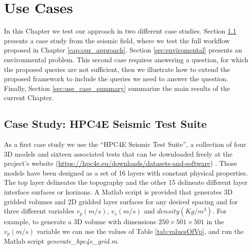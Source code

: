 \chapter[Use Cases]{Use Cases}\label{cap:use_cases}
In this Chapter we test our approach in two different case studies. Section \ref{sec:seismic} presents a case study from the seismic field, where we test the full workflow proposed in Chapter \ref{cap:our_approach}. Section \ref{sec:enviromental} presents an environmental problem. This second case requires answering a question, for which the proposed queries are not sufficient, then we illustrate how to extend the proposed framework to include the queries we need to answer the question. Finally, Section \ref{sec:use_case_summary} summarize the main results of the current Chapter.

\section{Case Study: HPC4E Seismic Test Suite}\label{sec:seismic}
As a first case study we use the “HPC4E Seismic Test Suite”, a collection of four 3D models and sixteen associated tests that can be downloaded freely at the project's website (\url{https://hpc4e.eu/downloads/datasets-and-software}) \cite{deLaPuente2015}. Those models have been designed as a set of 16 layers with constant physical properties. The top layer delineates the topography and the other 15 delineate different layer interface surfaces or horizons. A Matlab script is provided that generates 3D gridded volumes and 2D gridded layer surfaces for any desired spacing and for three different variables $v_{p}(m/s)$, $v_{s}(m/s)$ and $density(Kg/m^3)$. For example, to generate a 3D volume with dimensions $250\times501\times501$ in the $v_{p}(m/s)$ variable we can use the values of Table \ref{tab:valuesOfVp}, and run the Matlab script \textit{generate\_hpc4e\_grid.m}.

